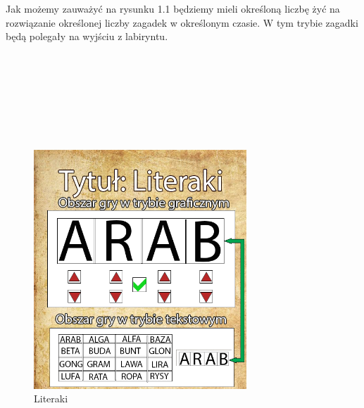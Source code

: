 \hspace{-0.60cm}Jak możemy zauważyć na rysunku 1.1 będziemy mieli określoną liczbę żyć na rozwiązanie określonej liczby zagadek w określonym czasie. W tym trybie zagadki będą polegały na wyjściu z labiryntu.
\\
\\
\\
\\
\\
\\
\\
\\
	\begin{figure}[!htb]
	\begin{center}
		\includegraphics[width=8cm]{rys/gra4.png}
		\caption{Literaki}
		\label{rys:rysunek001}
	\end{center}
\end{figure}

